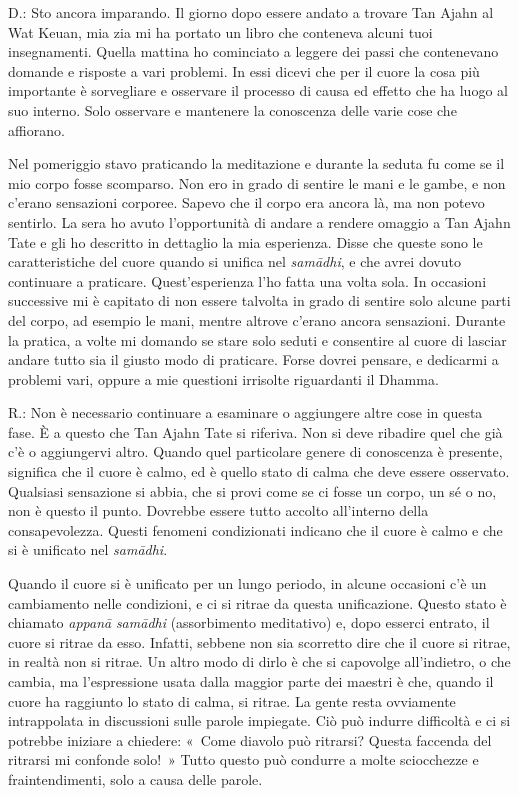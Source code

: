 D.: Sto ancora imparando. Il giorno dopo essere andato a trovare Tan
Ajahn al Wat Keuan, mia zia mi ha portato un libro che conteneva alcuni
tuoi insegnamenti. Quella mattina ho cominciato a leggere dei passi che
contenevano domande e risposte a vari problemi. In essi dicevi che per
il cuore la cosa più importante è sorvegliare e osservare il processo di
causa ed effetto che ha luogo al suo interno. Solo osservare e mantenere
la conoscenza delle varie cose che affiorano.

Nel pomeriggio stavo praticando la meditazione e durante la seduta fu
come se il mio corpo fosse scomparso. Non ero in grado di sentire le
mani e le gambe, e non c'erano sensazioni corporee. Sapevo che il corpo
era ancora là, ma non potevo sentirlo. La sera ho avuto l'opportunità di
andare a rendere omaggio a Tan Ajahn Tate e gli ho descritto in
dettaglio la mia esperienza. Disse che queste sono le caratteristiche
del cuore quando si unifica nel \emph{samādhi}, e che avrei dovuto
continuare a praticare. Quest'esperienza l'ho fatta una volta sola. In
occasioni successive mi è capitato di non essere talvolta in grado di
sentire solo alcune parti del corpo, ad esempio le mani, mentre altrove
c'erano ancora sensazioni. Durante la pratica, a volte mi domando se
stare solo seduti e consentire al cuore di lasciar andare tutto sia il
giusto modo di praticare. Forse dovrei pensare, e dedicarmi a problemi
vari, oppure a mie questioni irrisolte riguardanti il Dhamma.

R.: Non è necessario continuare a esaminare o aggiungere altre cose in
questa fase. È a questo che Tan Ajahn Tate si riferiva. Non si deve
ribadire quel che già c'è o aggiungervi altro. Quando quel particolare
genere di conoscenza è presente, significa che il cuore è calmo, ed è
quello stato di calma che deve essere osservato. Qualsiasi sensazione si
abbia, che si provi come se ci fosse un corpo, un sé o no, non è questo
il punto. Dovrebbe essere tutto accolto all'interno della
consapevolezza. Questi fenomeni condizionati indicano che il cuore è
calmo e che si è unificato nel \emph{samādhi}.

Quando il cuore si è unificato per un lungo periodo, in alcune occasioni
c'è un cambiamento nelle condizioni, e ci si ritrae da questa
unificazione. Questo stato è chiamato \emph{appanā} \emph{samādhi}
(assorbimento meditativo) e, dopo esserci entrato, il cuore si ritrae da
esso. Infatti, sebbene non sia scorretto dire che il cuore si ritrae, in
realtà non si ritrae. Un altro modo di dirlo è che si capovolge
all'indietro, o che cambia, ma l'espressione usata dalla maggior parte
dei maestri è che, quando il cuore ha raggiunto lo stato di calma, si
ritrae. La gente resta ovviamente intrappolata in discussioni sulle
parole impiegate. Ciò può indurre difficoltà e ci si potrebbe iniziare a
chiedere: «~Come diavolo può ritrarsi? Questa faccenda del ritrarsi mi
confonde solo!~» Tutto questo può condurre a molte sciocchezze e
fraintendimenti, solo a causa delle parole.

